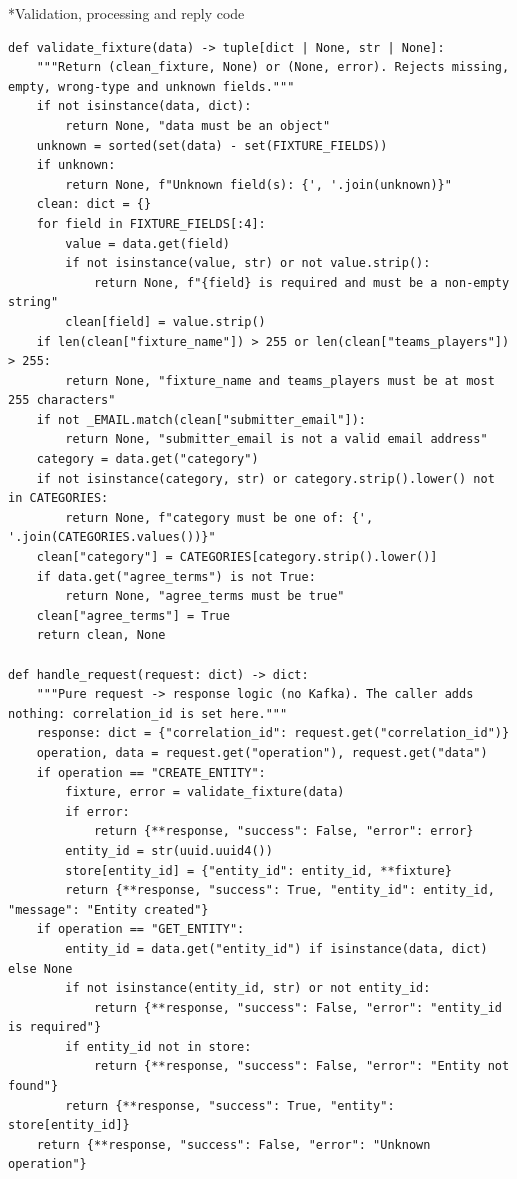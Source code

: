 \documentclass[11pt]{article}
\makeatletter
\renewcommand\subsection{\@startsection{subsection}{2}{\z@}{-2.2ex \@plus -1ex \@minus -.2ex}{0.8ex \@plus.2ex}{\normalfont\fontsize{12}{14.5}\selectfont\bfseries}}
\makeatother
\begin{document}
\subsection*{Validation, processing and reply code}
\begingroup\lstset{basicstyle=\ttfamily\tiny}
\begin{lstlisting}
def validate_fixture(data) -> tuple[dict | None, str | None]:
    """Return (clean_fixture, None) or (None, error). Rejects missing, empty, wrong-type and unknown fields."""
    if not isinstance(data, dict):
        return None, "data must be an object"
    unknown = sorted(set(data) - set(FIXTURE_FIELDS))
    if unknown:
        return None, f"Unknown field(s): {', '.join(unknown)}"
    clean: dict = {}
    for field in FIXTURE_FIELDS[:4]:
        value = data.get(field)
        if not isinstance(value, str) or not value.strip():
            return None, f"{field} is required and must be a non-empty string"
        clean[field] = value.strip()
    if len(clean["fixture_name"]) > 255 or len(clean["teams_players"]) > 255:
        return None, "fixture_name and teams_players must be at most 255 characters"
    if not _EMAIL.match(clean["submitter_email"]):
        return None, "submitter_email is not a valid email address"
    category = data.get("category")
    if not isinstance(category, str) or category.strip().lower() not in CATEGORIES:
        return None, f"category must be one of: {', '.join(CATEGORIES.values())}"
    clean["category"] = CATEGORIES[category.strip().lower()]
    if data.get("agree_terms") is not True:
        return None, "agree_terms must be true"
    clean["agree_terms"] = True
    return clean, None

def handle_request(request: dict) -> dict:
    """Pure request -> response logic (no Kafka). The caller adds nothing: correlation_id is set here."""
    response: dict = {"correlation_id": request.get("correlation_id")}
    operation, data = request.get("operation"), request.get("data")
    if operation == "CREATE_ENTITY":
        fixture, error = validate_fixture(data)
        if error:
            return {**response, "success": False, "error": error}
        entity_id = str(uuid.uuid4())
        store[entity_id] = {"entity_id": entity_id, **fixture}
        return {**response, "success": True, "entity_id": entity_id, "message": "Entity created"}
    if operation == "GET_ENTITY":
        entity_id = data.get("entity_id") if isinstance(data, dict) else None
        if not isinstance(entity_id, str) or not entity_id:
            return {**response, "success": False, "error": "entity_id is required"}
        if entity_id not in store:
            return {**response, "success": False, "error": "Entity not found"}
        return {**response, "success": True, "entity": store[entity_id]}
    return {**response, "success": False, "error": "Unknown operation"}
\end{lstlisting}
\end{document}

